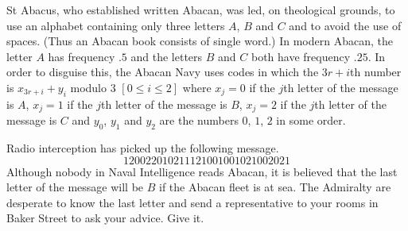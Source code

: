 \begin{question}\label{E;abacus}\label{C4.11}
St Abacus, who established written Abacan,
was led, on theological grounds, to use an alphabet containing
only
three letters $A$, $B$ and $C$ and to avoid the use of
spaces. (Thus an Abacan book consists of single word.) 
In modern Abacan, the letter
$A$ has frequency $.5$ and the letters $B$ and $C$ both 
have frequency $.25$. In order to disguise this,
the Abacan Navy uses codes in which the
$3r+i$th number is $x_{3r+i}+y_{i}$ modulo $3$ $[0\leq i\leq 2]$
where $x_{j}=0$ if the $j$th letter of the message is $A$,
$x_{j}=1$ if the $j$th letter of the message is $B$,
$x_{j}=2$ if the $j$th letter of the message is $C$
and $y_{0}$, $y_{1}$ and $y_{2}$ are the numbers $0$, $1$, $2$
in some order.  

Radio interception has picked up the following message.
\[120022010211121001001021002021\]
Although nobody in Naval Intelligence reads Abacan, 
it is believed that the last letter of the message will
be $B$ if the Abacan fleet is at sea. 
The Admiralty are desperate to know the last letter
and send a representative to your rooms
in Baker Street to ask your advice. Give it.
\end{question} 

